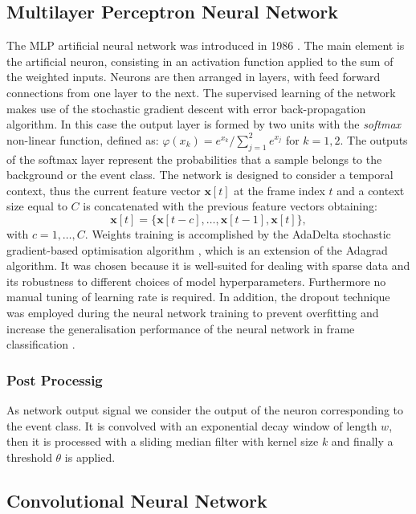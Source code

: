 \documentclass{article}
\begin{document}
\begin{sloppy}
\subsection{Multilayer Perceptron Neural Network}
The MLP artificial neural network was introduced in 1986 \cite{Rumelhart86-LRB}. The main element is the artificial neuron, consisting in an activation function applied to the sum of the weighted inputs. Neurons are then arranged in layers, with feed forward connections from one layer to the next. The supervised learning of the network makes use of the stochastic gradient descent with error back-propagation algorithm. In this case the output layer is formed by two units with the \textit{softmax} non-linear function, defined as:  $\varphi(x_k) = e^{x_k}/\sum_{j=1}^{2}e^{x_j}$ for $k=1,2$. The outputs of the softmax layer represent the probabilities that a sample belongs to the background or the event class. 
The network is designed to consider a temporal context, thus the current feature vector $\mathbf{x}[t]$ at the frame index $t$ and a context size equal to $C$ is concatenated with the previous feature vectors obtaining:
\begin{equation}
\mathbf{x}[t] =  \{\mathbf{x}[t - c],\ldots,\mathbf{x}[t-1],\mathbf{x}[t]\},
\end{equation}
with $c = 1, \dots, C$. Weights training is accomplished by the AdaDelta stochastic gradient-based optimisation algorithm \cite{zeiler2012adadelta}, which is an extension of the Adagrad \cite{duchi2011adaptive} algorithm. It was chosen because it is well-suited for dealing with sparse data and its robustness to different choices of model hyperparameters. Furthermore no manual tuning of learning rate is required. In addition, the dropout technique was employed during the neural network training to prevent overfitting and increase the generalisation performance of the neural network in frame classification \cite{srivastava2014dropout}. 

\subsubsection{Post Processig}
As network output signal we consider the output of the neuron corresponding to the event class. It is convolved with an exponential decay window of length $w$, then it is processed with a sliding median filter with kernel size $k$ and finally a threshold $\theta$ is applied.

\subsection{Convolutional Neural Network}


\end{sloppy}
\end{document}
